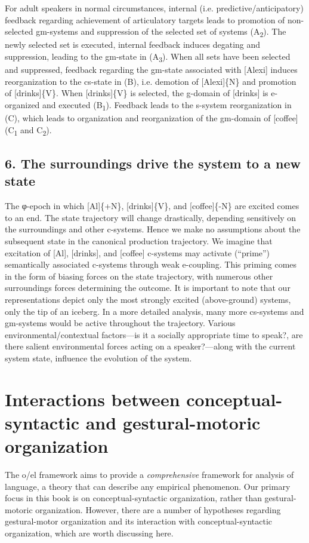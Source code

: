   For adult speakers in normal circumstances, internal (i.e. predictive/anticipatory) feedback regarding achievement of articulatory targets leads to promotion of non-selected gm-systems and suppression of the selected set of systems (A\textsubscript{2}). The newly selected set is executed, internal feedback induces degating and suppression, leading to the gm-state in (A\textsubscript{3}). When all sets have been selected and suppressed, feedback regarding the gm-state associated with [Alexi] induces reorganization to the cs-state in (B), i.e. demotion of [Alexi]\{N\} and promotion of [drinks]\{V\}. When [drinks]\{V\} is selected, the g-domain of [drinks] is e-organized and executed (B\textsubscript{1}). Feedback leads to the s-system reorganization in (C), which leads to organization and reorganization of the gm-domain of [coffee] (C\textsubscript{1} and C\textsubscript{2}).

\subsection{6. The surroundings drive the system to a new state}

The φ-epoch in which [Al]\{+N\}, [drinks]\{V\}, and [coffee]\{-N\} are excited comes to an end. The state trajectory will change drastically, depending sensitively on the surroundings and other c-systems. Hence we make no assumptions about the subsequent state in the canonical production trajectory. We imagine that excitation of [Al], [drinks], and [coffee] c-systems may activate (“prime”) semantically associated c-systems through weak e-coupling. This priming comes in the form of biasing forces on the state trajectory, with numerous other surroundings forces determining the outcome. It is important to note that our representations depict only the most strongly excited (above-ground) systems, only the tip of an iceberg. In a more detailed analysis, many more cs-systems and gm-systems would be active throughout the trajectory. Various environmental/contextual factors—is it a socially appropriate time to speak?, are there salient environmental forces acting on a speaker?—along with the current system state, influence the evolution of the system. 

\section{Interactions between conceptual-syntactic and gestural-motoric organization}

The o/el framework aims to provide a \textit{comprehensive} framework for analysis of language, a theory that can describe any empirical phenomenon. Our primary focus in this book is on conceptual-syntactic organization, rather than gestural-motoric organization. However, there are a number of hypotheses regarding gestural-motor organization and its interaction with conceptual-syntactic organization, which are worth discussing here.


